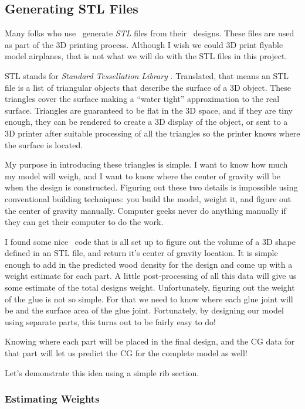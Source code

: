 \subsection{Generating STL Files}

Many folks who use \osc\ generate {\it STL} files from their \osc\ designs. These
files are used as part of the 3D printing process. Although I wish we could 3D
print flyable model airplanes, that is not what we will do with the STL files
in this project.

STL stands for {\it Standard Tessellation Library} \citep{stlwiki}. Translated,
that means an STL file is a list of triangular objects that describe the
surface of a 3D object. These triangles cover the surface making a ``water
tight'' approximation to the real surface. Triangles are guaranteed to be flat
in the 3D space, and if they are tiny enough, they can be rendered to create a
3D display of the object, or sent to a 3D printer after suitable processing of all
the triangles so the printer knows where the surface is located.

My purpose in introducing these triangles is simple. I want to know how much my
model will weigh, and I want to know where the center of gravity will be when
the design is constructed. Figuring out these two details is impossible using
conventional building techniques: you build the model, weight it, and figure
out the center of gravity manually. Computer geeks never do anything manually
if they can get their computer to do the work.

I found some nice \PY\ code that is all set up to figure out the volume of a 3D
shape defined in an STL file, and return it's center of gravity location. It is
simple enough to add in the predicted wood density for the design and come up
with a weight estimate for each part. A little post-processing of all this data
will give us some estimate of the total designs weight. Unfortunately, figuring
out the weight of the glue is not so simple. For that we need to know where
each glue joint will be and the surface area of the glue joint. Fortunately, by
designing our model using separate parts, this turns out to be fairly easy to
do!

Knowing where each part will be placed in the final design, and the CG data for
that part will let us predict the CG for the complete model as well!

Let's demonstrate this idea using a simple rib section.

\subsubsection{Estimating Weights}

